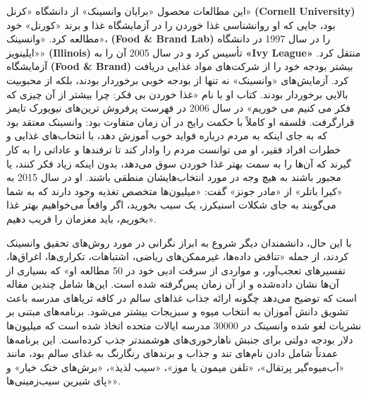 این مطالعات محصول «برایان وانسینک» از دانشگاه «کرنل» \textenglish{\textbf{(Cornell University)}}  بود، جایی که او روانشناسی غذا خوردن را در آزمایشگاه غذا و برند «کورنل» خود مطالعه کرد.
«وانسینک»، \textenglish{\textbf{(Food \& Brand Lab)}} را در سال 1997 در دانشگاه «ایلینویز» \textenglish{\textbf{(Illinois)}} تأسیس کرد و در سال 2005 آن را به \textenglish{\textbf{«Ivy League»}} منتقل کرد.
آزمایشگاه \textenglish{\textbf{(Food \& Brand)}} بیشتر بودجه خود را از شرکت‌های مواد غذایی دریافت کرد.
آزمایش‌های «وانسینک» نه تنها از بودجه خوبی برخوردار بودند، بلکه از محبوبیت بالایی برخوردار بودند.
کتاب او با نام «غذا خوردن بی فکر: چرا بیشتر از آن چیزی که فکر می کنیم می خوریم» در سال 2006 در فهرست پرفروش ترین‌های نیویورک تایمز قرار‌گرفت.
فلسفه او کاملاً با حکمت رایج در آن زمان متفاوت بود: وانسینک معتقد بود که به جای اینکه به مردم درباره فواید خوب آموزش دهد، با انتخاب‌های غذایی و خطرات افراد فقیر، او می توانست مردم را وادار کند تا ترفندها و عاداتی را به کار گیرند که آن‌ها را به سمت بهتر غذا خوردن سوق می‌دهد، بدون اینکه زیاد فکر کنند، یا مجبور باشند به هیچ وجه در مورد انتخاب‌هایشان منطقی باشند.
او در سال 2015 به «کیرا باتلر» از «مادر جونز» گفت: «میلیون‌ها متخصص تغذیه وجود دارند که به شما می‌گویند به جای شکلات اسنیکرز، یک سیب بخورید، اگر واقعاً می‌خواهیم بهتر غذا بخوریم، باید مغزمان را فریب دهیم».

با این حال، دانشمندان دیگر شروع به ابراز نگرانی در مورد روش‌های تحقیق وانسینک کردند، از جمله «تناقض داده‌ها، غیرممکن‌های ریاضی، اشتباهات، تکراری‌ها، اغراق‌ها، تفسیرهای تعجب‌آور، و مواردی از سرقت ادبی خود در 50 مطالعه او» که بسیاری از آن‌ها نشان داده‌شده و از آن زمان پس‌گرفته شده است.
این‌ها شامل چندین مقاله است که توضیح می‌دهد چگونه ارائه جذاب غذاهای سالم در کافه تریاهای مدرسه باعث تشویق دانش آموزان به انتخاب میوه و سبزیجات بیشتر می‌شود.
برنامه‌های مبتنی بر نشریات لغو شده وانسینک در 30000 مدرسه ایالات متحده اتخاذ شده است که میلیون‌ها دلار بودجه دولتی برای جنبش ناهارخوری‌های هوشمندتر جذب کرده‌است.
این برنامه‌ها عمدتاً شامل دادن نام‌های تند و جذاب و برندهای رنگارنگ به غذای سالم بود، مانند «آب‌میوه‌گیر پرتقال»، «تلفن میمون یا موز»، «سیب لذیذ»، «برش‌های خنک خیار» و «پای شیرین سیب‌زمینی‌ها».

